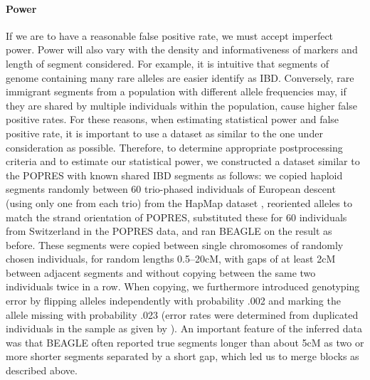 \documentclass{article}
\begin{document}
\paragraph{Power}
If we are to have a reasonable false positive rate, we must accept
imperfect power. Power will also vary with the density and
informativeness of markers and length of segment considered. 
For example, it is intuitive that segments of genome containing many rare alleles are easier identify as IBD.
Conversely, rare immigrant segments from a population with different
allele frequencies may, if they are shared by multiple individuals
within the population, cause higher false positive rates.
For these reasons, when estimating statistical power and false positive rate,
it is important to use a dataset as similar to the one under consideration as possible.
Therefore, to determine appropriate postprocessing criteria and to estimate our statistical power,
we constructed a dataset similar to the POPRES with known shared IBD segments as follows:
we copied haploid segments randomly between 60 trio-phased individuals of European descent (using only one from each trio) 
from the HapMap dataset \citep[haplotypes from release \#21, 17/07/06][]{hapmap2007second},
reoriented alleles to match the strand orientation of POPRES,
substituted these for 60 individuals from Switzerland in the POPRES data,
and ran BEAGLE on the result as before.
These segments were copied between single chromosomes of randomly chosen individuals, for random lengths 0.5--20cM,
with gaps of at least 2cM between adjacent segments and without copying between the same two individuals twice in a row.
When copying, we furthermore introduced genotyping error by flipping alleles independently with probability .002
and marking the allele missing with probability .023 (error rates were
determined from duplicated individuals in the sample as given by \citet{nelson2008population}).
An important feature of the inferred data was that 
BEAGLE often reported true segments longer than about 5cM
as two or more shorter segments separated by a short gap, 
which led us to merge blocks as described above.
\end{document}
